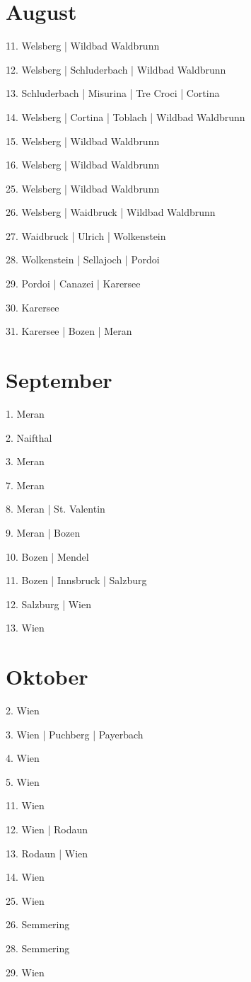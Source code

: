 \documentclass[twoside=false,titlepage=false,open=any, parskip=never, fontsize=10pt, headings=small, chapterprefix=false, appendixprefix=false, DIV=15]{scrbook}
\begin{document}
\begin{multicols}{3}
            \section*{August}
            11. Welsberg | Wildbad Waldbrunn\par
            12. Welsberg | Schluderbach | Wildbad Waldbrunn\par
            13. Schluderbach | Misurina | Tre Croci | Cortina\par
            14. Welsberg | Cortina | Toblach | Wildbad Waldbrunn\par
            15. Welsberg | Wildbad Waldbrunn\par
            16. Welsberg | Wildbad Waldbrunn\par
            25. Welsberg | Wildbad Waldbrunn\par
            26. Welsberg | Waidbruck | Wildbad Waldbrunn\par
            27. Waidbruck | Ulrich | Wolkenstein\par
            28. Wolkenstein | Sellajoch | Pordoi\par
            29. Pordoi | Canazei | Karersee\par
            30. Karersee\par
            31. Karersee | Bozen | Meran\par
            \section*{September}
            1. Meran\par
            2. Naifthal\par
            3. Meran\par
            7. Meran\par
            8. Meran | St. Valentin\par
            9. Meran | Bozen\par
            10. Bozen | Mendel\par
            11. Bozen | Innsbruck | Salzburg\par
            12. Salzburg | Wien\par
            13. Wien\par
            \section*{Oktober}
            2. Wien\par
            3. Wien | Puchberg | Payerbach\par
            4. Wien\par
            5. Wien\par
            11. Wien\par
            12. Wien | Rodaun\par
            13. Rodaun | Wien\par
            14. Wien\par
            25. Wien\par
            26. Semmering\par
            28. Semmering\par
            29. Wien\par

\end{multicols}
\end{document}
